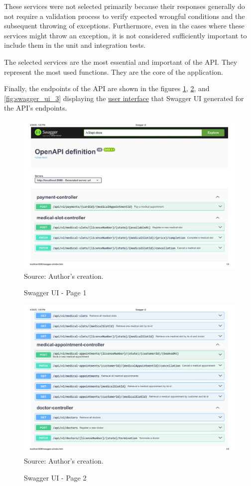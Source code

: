 These services were not selected primarily because their responses generally do not require a validation process to verify expected wrongful conditions and the subsequent throwing of exceptions. Furthermore, even in the cases where these services might throw an exception, it is not considered sufficiently important to include them in the unit and integration tests.

The selected services are the most essential and important of the API. They represent the most used functions. They are the core of the application.

Finally, the endpoints of the API are shown in the figures \ref{fig:swagger_ui_1}, \ref{fig:swagger_ui_2}, and \ref{fig:swagger_ui_3} 
displaying the \hyperref[appendix:glossary]{user interface} that Swagger UI generated for the API's endpoints.


\begin{figure}[H]
	\centering
	\caption{Swagger UI - Page 1}
	\includegraphics[width=0.83\linewidth]{figures/swagger_ui_1.png}
	\label{fig:swagger_ui_1}
	\\ \footnotesize Source: Author's creation.
\end{figure}

\begin{figure}[H]
	\centering
	\caption{Swagger UI - Page 2}
	\includegraphics[width=0.83\linewidth]{figures/swagger_ui_2.png}
	\label{fig:swagger_ui_2}
	\\ \footnotesize Source: Author's creation.
\end{figure}

